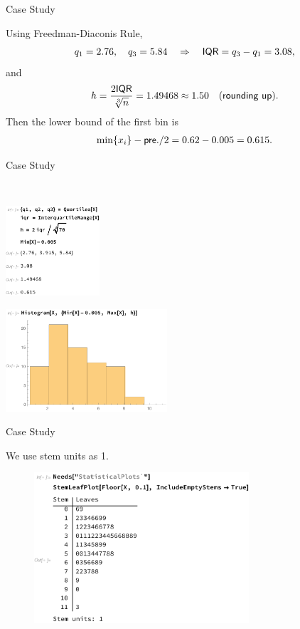 \begin{frame}{Case Study}

 Using Freedman-Diaconis Rule,
\begin{align*}
q_1 = 2.76, \quad q_3 = 5.84 \quad \Rightarrow\quad \mathsf{IQR} = q_3 - q_1 = 3.08,
\end{align*}
and
\begin{align*}
h = \frac{2\mathsf{IQR}}{\sqrt[3]{n}} = 1.49468 \approx 1.50 \quad (\mathsf{rounding\ up}).
\end{align*}
Then the lower bound of the first bin is
\begin{align*}
\min\{x_i\} - \mathsf{pre.} / 2 = 0.62 - 0.005 = 0.615.
\end{align*}

\end{frame}


\begin{frame}{Case Study}

 \\
\begin{minipage}{0.3\linewidth}
	\centering
	\includegraphics[width=3.5cm]{./images/rc4fig7.pdf}
\end{minipage}
\begin{minipage}{0.6\linewidth}
	\centering
	\includegraphics[width=6cm]{./images/rc4fig8.pdf}
\end{minipage}

\end{frame}


\begin{frame}{Case Study}

 We use stem units as 1.
\begin{figure}[htbp]
	\centering
	\includegraphics[width=8cm]{./images/rc4fig9.pdf}
\end{figure}

\end{frame}



